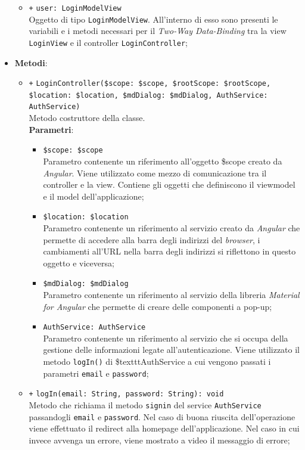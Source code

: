 \begin{itemize}
\begin{itemize}
		\item \texttt{+} \texttt{user: LoginModelView} \\
		Oggetto di tipo \texttt{LoginModelView}. All'interno di esso sono presenti le variabili e i metodi necessari per il \textit{Two-Way Data-Binding} tra la view \texttt{LoginView} e il controller \texttt{LoginController};
	\end{itemize}
	\item \textbf{Metodi}:
	\begin{itemize}
		\item \texttt{+} \texttt{LoginController(\$scope: \$scope, \$rootScope: \$rootScope, \$location: \$location, \$mdDialog: \$mdDialog, AuthService: AuthService)} \\
		Metodo costruttore della classe. \\
		\textbf{Parametri}:
			\begin{itemize}
				\item \texttt{\$scope: \$scope} \\
				Parametro contenente un riferimento all’oggetto \$scope creato da \textit{Angular}. Viene utilizzato come mezzo di comunicazione tra il controller e la view. Contiene gli oggetti che definiscono il viewmodel e il model dell’applicazione;
				\item \texttt{\$location: \$location} \\
				Parametro contenente un riferimento al servizio creato da \textit{Angular} che permette di accedere alla barra degli indirizzi del \textit{browser}, i cambiamenti all’URL nella barra degli indirizzi si riflettono in questo oggetto e viceversa;
				\item \texttt{\$mdDialog: \$mdDialog} \\
				Parametro contenente un riferimento al servizio della libreria \textit{Material for Angular} che permette di creare delle componenti a pop-up;
				\item \texttt{AuthService: AuthService} \\
				Parametro contenente un riferimento al servizio che si occupa della gestione delle informazioni legate all’autenticazione. Viene utilizzato il metodo \texttt{logIn()} di \$texttt{AuthService} a cui vengono passati i parametri \texttt{email} e \texttt{password};
			\end{itemize}
		\item \texttt{+} \texttt{logIn(email: String, password: String): void} \\
		Metodo che richiama il metodo \texttt{signin} del service \texttt{AuthService} passandogli \texttt{email} e \texttt{password}. Nel caso di buona riuscita dell'operazione viene effettuato il redirect alla homepage dell'applicazione. Nel caso in cui invece avvenga un errore, viene mostrato a video il messaggio di errore;

\end{itemize}
\end{itemize}
